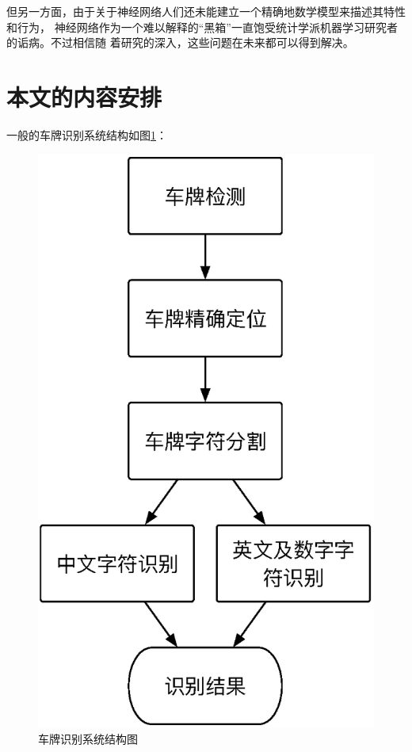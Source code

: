 但另一方面，由于关于神经网络人们还未能建立一个精确地数学模型来描述其特性和行为，
神经网络作为一个难以解释的“黑箱”一直饱受统计学派机器学习研究者的诟病。不过相信随
着研究的深入，这些问题在未来都可以得到解决。

\section{本文的内容安排}

一般的车牌识别系统结构如图\ref{Fig:SystemArch}：

\begin{figure}[ht]
  \centering
  \includegraphics[height=0.5\textheight, keepaspectratio]{./Figure/SystemArch.eps}
  \caption{车牌识别系统结构图}\label{Fig:SystemArch}
\end{figure}

